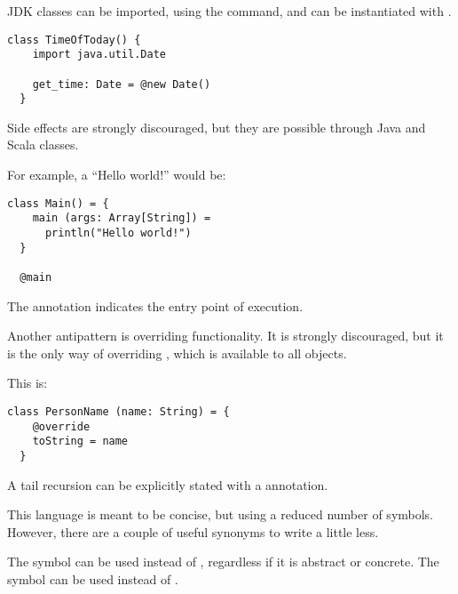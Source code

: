 JDK classes can be imported, using the \simport command, and can be instantiated with \snew.

\begin{lstlisting}[label={lst:exampleJDKImport}]
  class TimeOfToday() {
    import java.util.Date

    get_time: Date = @new Date()
  }
\end{lstlisting}

Side effects are strongly discouraged, but they are possible through Java and Scala classes.

For example, a ``Hello world!'' would be:
\begin{lstlisting}[label={lst:exampleHelloWorld}]
  class Main() = {
    main (args: Array[String]) =
      println("Hello world!")
  }

  @main
\end{lstlisting}

The \smain annotation indicates the entry point of execution.

Another antipattern is overriding functionality.
It is strongly discouraged, but it is the only way of overriding , which is available to all objects.

This is:
\begin{lstlisting}[label={lst:exampleToString}]
  class PersonName (name: String) = {
    @override
    toString = name
  }
\end{lstlisting}

A tail recursion can be explicitly stated with a \stailrec annotation.

This language is meant to be concise, but using a reduced number of symbols.
However, there are a couple of useful synonyms to write a little less.

The symbol \sasterisk can be used instead of \sclass, regardless if it is abstract or concrete.
The symbol \splus can be used instead of \simport.

